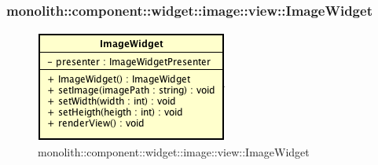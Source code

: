 \subsubsection{monolith::component::widget::image::view::ImageWidget}

\label{monolith::component::widget::image::view::ImageWidget}
\begin{figure}[H]
	\centering
	\includegraphics[scale=0.5]{Sezioni/SottosezioniST/img/ImageWidget.png}
	\caption{monolith::component::widget::image::view::ImageWidget}
\end{figure}

